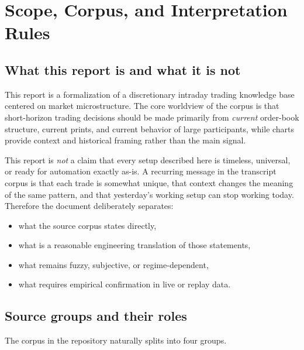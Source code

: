 \section{Scope, Corpus, and Interpretation Rules}

\subsection{What this report is and what it is not}

This report is a formalization of a discretionary intraday trading knowledge base centered on market microstructure. The core worldview of the corpus is that short-horizon trading decisions should be made primarily from \emph{current} order-book structure, current prints, and current behavior of large participants, while charts provide context and historical framing rather than the main signal.

This report is \emph{not} a claim that every setup described here is timeless, universal, or ready for automation exactly as-is. A recurring message in the transcript corpus is that each trade is somewhat unique, that context changes the meaning of the same pattern, and that yesterday's working setup can stop working today. Therefore the document deliberately separates:

\begin{itemize}
\item what the source corpus states directly,
\item what is a reasonable engineering translation of those statements,
\item what remains fuzzy, subjective, or regime-dependent,
\item what requires empirical confirmation in live or replay data.
\end{itemize}

\subsection{Source groups and their roles}

The corpus in the repository naturally splits into four groups.

